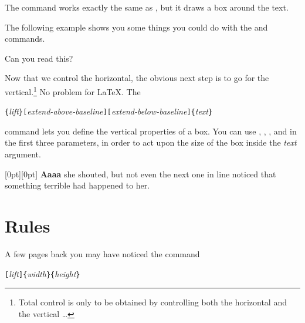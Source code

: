The command  works exactly the same as , but
it draws a box around the text.

The following example shows you some things you could do with
the  and  commands.

\begin{example}
\par
{}\par
{} \par
\hspace{1cm} %
 \par
{}
Can you read this?
\end{example}

Now that we control the horizontal, the obvious next step is to go for
the vertical.\footnote{Total control is only to be obtained by
  controlling both the horizontal and the vertical \ldots}
No problem for \LaTeX{}. The

\begin{lscommand}
  \verb|{|\emph{lift}\verb|}[|\emph{extend-above-baseline}\verb|][|\emph{extend-below-baseline}\verb|]{|\emph{text}\verb|}|
\end{lscommand}

\noindent command lets you define the vertical properties of a
box. You can use , , , and
 in the first three parameters, in order to act
upon the size of the box inside the \emph{text} argument.

\begin{example}[examplewidth=0.45\linewidth]
\raisebox{0pt}[0pt][0pt]{\Large%
\textbf{Aaaa\raisebox{-0.3ex}{a}%
\raisebox{-0.7ex}{aa}%
\raisebox{-1.2ex}{r}%
\raisebox{-2.2ex}{g}%
\raisebox{-4.5ex}{h}}}
she shouted, but not even the next
one in line noticed that something
terrible had happened to her.
\end{example}

\section{Rules}\label{sec:rule}

A few pages back you may have noticed the command

\begin{lscommand}
  \verb|[|\emph{lift}\verb|]{|\emph{width}\verb|}{|\emph{height}\verb|}|
\end{lscommand}

